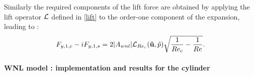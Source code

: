 \documentclass[twocolumn,10pt]{asme2ej}
\newcommand{\be}[1]{ \begin{equation} \label{#1}}
\newcommand{\ee}{\end{equation}}
\begin{document}
Similarly the required components of the lift force are obtained by applying the lift operator ${\cal L}$ defined in \ref{lift} 
to the order-one component of the expansion, leading to :
\be{lift_cos}
F_{y,1,c} - i F_{y,1,s} = 2 |A_{wnl}| {\cal{L}}_{Re_c}( {\bf \hat{u}},\hat{p} ) \sqrt{\frac{1}{Re_c}-\frac{1}{Re}}.
\ee





\paragraph{WNL model : implementation and results for the cylinder}
\end{document}

